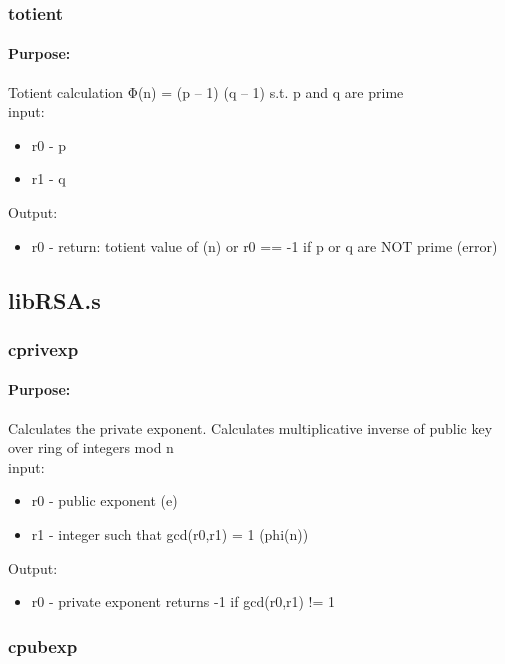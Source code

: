 \documentclass{article}
\begin{document}
        \subsubsection{totient}
            \paragraph*{Purpose:}
                {Totient calculation Φ(n) = (p – 1) (q – 1) s.t. p and q are prime \\ }
                input:\begin{itemize}
                    \item r0 - p
                    \item r1 - q
                \end{itemize}
                Output:\begin{itemize}
                    \item r0 - return: totient value of (n) or r0 == -1 if p or q are NOT prime (error)
                \end{itemize}
    \subsection{libRSA.s}
        \subsubsection{cprivexp}
            \paragraph*{Purpose:}
                {Calculates the private exponent. Calculates multiplicative inverse of public key over ring of integers mod n \\}
                input:\begin{itemize}
                    \item r0 - public exponent (e)
                    \item r1 - integer such that gcd(r0,r1) = 1 (phi(n))
                \end{itemize}
                Output:\begin{itemize}
                    \item r0 - private exponent returns -1 if gcd(r0,r1) != 1
                \end{itemize}
        \subsubsection{cpubexp}
\end{document}
